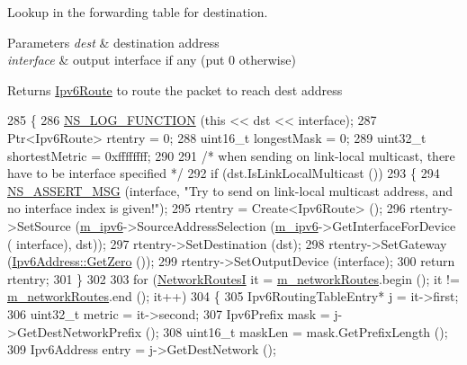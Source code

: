 Lookup in the forwarding table for destination. 


\begin{DoxyParams}{Parameters}
{\em dest} & destination address \\
\hline
{\em interface} & output interface if any (put 0 otherwise) \\
\hline
\end{DoxyParams}
\begin{DoxyReturn}{Returns}
\hyperlink{classns3_1_1Ipv6Route}{Ipv6\+Route} to route the packet to reach dest address 
\end{DoxyReturn}

\begin{DoxyCode}
285 \{
286   \hyperlink{log-macros-disabled_8h_a90b90d5bad1f39cb1b64923ea94c0761}{NS\_LOG\_FUNCTION} (\textcolor{keyword}{this} << dst << interface);
287   Ptr<Ipv6Route> rtentry = 0;
288   uint16\_t longestMask = 0;
289   uint32\_t shortestMetric = 0xffffffff;
290 
291   \textcolor{comment}{/* when sending on link-local multicast, there have to be interface specified */}
292   \textcolor{keywordflow}{if} (dst.IsLinkLocalMulticast ())
293     \{
294       \hyperlink{assert_8h_aff5ece9066c74e681e74999856f08539}{NS\_ASSERT\_MSG} (interface, \textcolor{stringliteral}{"Try to send on link-local multicast address, and no interface
       index is given!"});
295       rtentry = Create<Ipv6Route> ();
296       rtentry->SetSource (\hyperlink{classns3_1_1Ipv6StaticRouting_aeb0293ac3549a6ca0ba7674d35646fc8}{m\_ipv6}->SourceAddressSelection (\hyperlink{classns3_1_1Ipv6StaticRouting_aeb0293ac3549a6ca0ba7674d35646fc8}{m\_ipv6}->GetInterfaceForDevice (
      interface), dst));
297       rtentry->SetDestination (dst);
298       rtentry->SetGateway (\hyperlink{classns3_1_1Ipv6Address_a63a34bdb1505e05fbdd07d316d0bd7e6}{Ipv6Address::GetZero} ());
299       rtentry->SetOutputDevice (interface);
300       \textcolor{keywordflow}{return} rtentry;
301     \}
302 
303   \textcolor{keywordflow}{for} (\hyperlink{classns3_1_1Ipv6StaticRouting_aaaf6779ff5a716ce508cac3017f5f769}{NetworkRoutesI} it = \hyperlink{classns3_1_1Ipv6StaticRouting_ac6d146555b173ef5ca8028ab981f8ab6}{m\_networkRoutes}.begin (); it != 
      \hyperlink{classns3_1_1Ipv6StaticRouting_ac6d146555b173ef5ca8028ab981f8ab6}{m\_networkRoutes}.end (); it++)
304     \{
305       Ipv6RoutingTableEntry* j = it->first;
306       uint32\_t metric = it->second;
307       Ipv6Prefix mask = j->GetDestNetworkPrefix ();
308       uint16\_t maskLen = mask.GetPrefixLength ();
309       Ipv6Address entry = j->GetDestNetwork ();

\end{DoxyCode}
